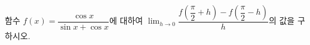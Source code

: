 함수 $f(x)=\dfrac{\cos x}{\sin x+\cos x}$에 대하여 $\displaystyle\lim_{h\to 0}\dfrac{f\left(\dfrac{\pi}{2}+h\right)-f\left(\dfrac{\pi}{2}-h\right)}{h}$의 값을 구하시오.
